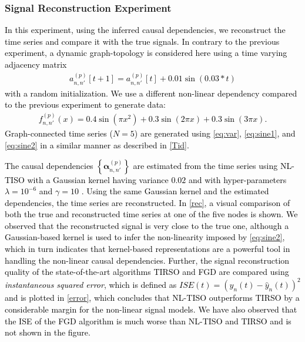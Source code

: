 \documentclass[conference]{IEEEtran}
\def\cbr#1{\left\lbrace #1 \right\rbrace}
\newcommand{\cB}[1]{\textcolor{black}{#1}}
\def\p {{(p)}}
\begin{document}
\subsubsection{Signal Reconstruction Experiment}
\label{srec}
\cB{In this experiment, using the inferred causal dependencies, we reconstruct the time series and compare it with the true signals. In contrary to the previous experiment, a dynamic graph-topology is considered here using a time varying adjacency matrix \quad
\begin{align}\label{eq:sine1}
    a^\p_{n,n'}[t+1]=a^\p_{n,n'}[t]+0.01\sin(0.03*t)
\end{align}
with a random initialization.
We use a different non-linear dependency compared to the previous experiment to generate data:
\begin{align}
    f_{n,n'}^{(p)}(x)=0.4\sin(\pi x^2)+0.3\sin(2\pi x)+0.3\sin(3\pi x).\label{eq:sine2}
\end{align}
Graph-connected time series ($N=5$) are generated using \eqref{eq:var}, \eqref{eq:sine1}, and \eqref{eq:sine2} in a similar manner as described in \cref{Tid}.} 

\cB{The causal dependencies $\cbr{\boldsymbol{\alpha}_{n,n'}^\p}$ are estimated from the time series using NL-TISO with a Gaussian kernel having variance $0.02$ and with hyper-parameters $\lambda=10^{-6}$ and $\gamma=10$ . Using the same Gaussian kernel and the estimated dependencies, the time series are reconstructed. In \cref{rec}, a visual comparison of both the true and reconstructed time series at one of the five nodes is shown. We observed that the reconstructed signal is very close to the true one, although a Gaussian-based kernel is used to infer the non-linearity imposed by \eqref{eq:sine2}, which in turn indicates that kernel-based representations are a powerful tool in handling the non-linear causal dependencies. Further, the signal reconstruction quality of the state-of-the-art algorithms TIRSO \cite{onlzam2019} and FGD \cite{only.s2018} are compared using \textit{instantaneous squared error}, which is defined as    $ISE(t)=(y_n(t)-\hat{y}_n(t))^2$ and is plotted in \cref{error}, which concludes that NL-TISO outperforms TIRSO by a considerable margin for the non-linear signal models. We have also observed that the ISE of the FGD algorithm is much worse than NL-TISO and TIRSO and is not shown in the figure.}
\end{document}
